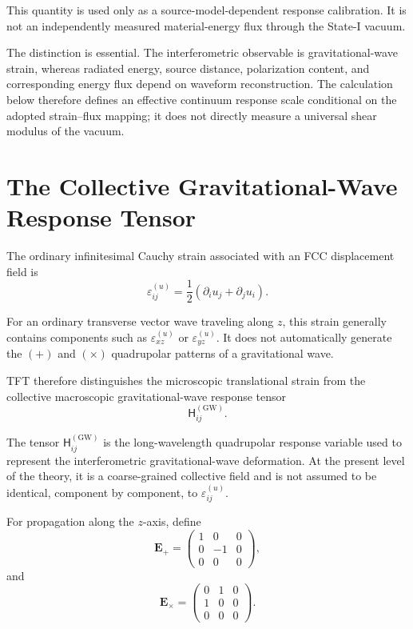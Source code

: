 This quantity is used only as a source-model-dependent response calibration. It is not an independently measured material-energy flux through the State-I vacuum.

The distinction is essential. The interferometric observable is gravitational-wave strain, whereas radiated energy, source distance, polarization content, and corresponding energy flux depend on waveform reconstruction. The calculation below therefore defines an effective continuum response scale conditional on the adopted strain--flux mapping; it does not directly measure a universal shear modulus of the vacuum.

\section{The Collective Gravitational-Wave Response Tensor}

The ordinary infinitesimal Cauchy strain associated with an FCC displacement field is
\begin{equation}
    \varepsilon_{ij}^{(u)} = \frac{1}{2} \left( \partial_i u_j + \partial_j u_i \right).
\end{equation}

For an ordinary transverse vector wave traveling along $z$, this strain generally contains components such as $\varepsilon_{xz}^{(u)}$ or $\varepsilon_{yz}^{(u)}$. It does not automatically generate the $(+)$ and $(\times)$ quadrupolar patterns of a gravitational wave.

TFT therefore distinguishes the microscopic translational strain from the collective macroscopic gravitational-wave response tensor
\begin{equation}
    \mathsf{H}_{ij}^{(\mathrm{GW})}.
\end{equation}

The tensor $\mathsf{H}_{ij}^{(\mathrm{GW})}$ is the long-wavelength quadrupolar response variable used to represent the interferometric gravitational-wave deformation. At the present level of the theory, it is a coarse-grained collective field and is not assumed to be identical, component by component, to $\varepsilon_{ij}^{(u)}$.

For propagation along the $z$-axis, define
\begin{equation}
    \mathbf{E}_{+} = 
    \begin{pmatrix}
        1 & 0 & 0 \\
        0 & -1 & 0 \\
        0 & 0 & 0
    \end{pmatrix},
\end{equation}
and
\begin{equation}
    \mathbf{E}_{\times} = 
    \begin{pmatrix}
        0 & 1 & 0 \\
        1 & 0 & 0 \\
        0 & 0 & 0
    \end{pmatrix}.
\end{equation}

